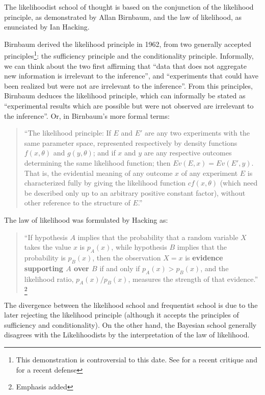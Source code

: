 \documentclass[twoside,12pt,a4paper]{article}
\begin{document}
The likelihoodist school of thought is based on the conjunction of the likelihood principle, as demonstrated
by Allan Birnbaum, and the law of likelihood, as enunciated by Ian Hacking.

Birnbaum derived the likelihood principle in 1962, from two generally accepted principles\footnote{
This demonstration is controversial to this date. See \citep{Mayo10} for a recent critique and 
\citep{Gandenberger12} for a recent defense}: the sufficiency principle and the conditionality principle.
Informally, we can think about the two first affirming that ``data that does not aggregate new information
is irrelevant to the inference'', and ``experiments that could have been realized but were not are irrelevant
to the inference''. From this principles, Birnbaum deduces the likelihood principle, which can informally
be stated as ``experimental results which are possible but were not observed are irrelevant to the 
inference''. Or, in Birnbaum's more formal terms:

\begin{quote}
``The likelihood principle: If $E$ and $E\prime$ are any two experiments with the same parameter space,
 represented respectively by density functions $f(x, \theta)$ and $g(y, \theta)$; and if $x$ and $y$ are
 any respective outcomes determining the same likelihood function; then $Ev(E, x) = Ev(E\prime, y)$.
 That is, the evidential meaning of any outcome $x$ of any experiment $E$ is characterized fully by giving
 the likelihood function $cf(x, \theta)$ (which need be described only up to an arbitrary positive constant
 factor), without other reference to the structure of $E$.''
\citep{Birnbaum62}
\end{quote}

The law of likelihood was formulated by Hacking as:

\begin{quote}
``If hypothesis $A$ implies that the probability that a random variable $X$ takes the value $x$ 
is $p_A(x)$, while hypothesis $B$ implies that the probability is $p_B(x)$, then the observation $X=x$
is \textbf{evidence supporting $A$ over $B$} if and only if $p_A(x) > p_B(x)$, and the likelihood ratio, 
$p_A(x)/p_B(x)$, measures the strength of that evidence.''
\citep{Hacking65}\footnote{Emphasis added}
\end{quote}

The divergence between the likelihood school and frequentist school is due to the later rejecting the
likelihood principle (although it accepts the principles of sufficiency and conditionality). On the other 
hand, the Bayesian school generally disagrees with the Likelihoodists by the interpretation of the law of
likelihood.
\end{document}
